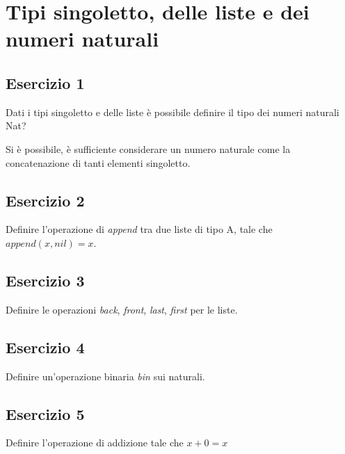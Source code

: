 \section{Tipi singoletto, delle liste e dei numeri naturali}
\subsection{Esercizio 1}
\begin{thm}
	Dati i tipi singoletto e delle liste è possibile definire il tipo dei numeri naturali Nat?
\end{thm}
Si è possibile, è sufficiente considerare un numero naturale come la concatenazione di tanti elementi singoletto. 

\subsection{Esercizio 2}
\begin{thm}
	Definire l'operazione di \textit{append} tra due liste di tipo A, tale che $append(x, nil) = x$.
\end{thm}


\subsection{Esercizio 3}
\begin{thm}
	Definire le operazioni \textit{back}, \textit{front}, \textit{last}, \textit{first} per le liste.
\end{thm}


\subsection{Esercizio 4}
\begin{thm}
	Definire un'operazione binaria \textit{bin} sui naturali.
\end{thm}


\subsection{Esercizio 5}
\begin{thm}
	Definire l'operazione di addizione tale che $x + 0 = x$
\end{thm}


